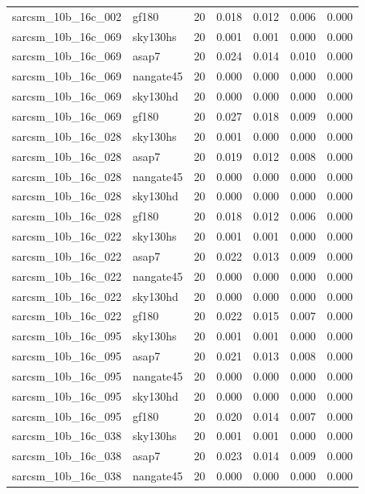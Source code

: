 \begin{tabular}{llrrrrr}
sarcsm\_10b\_16c\_002 & gf180 & 20 & 0.018 & 0.012 & 0.006 & 0.000 \\
sarcsm\_10b\_16c\_069 & sky130hs & 20 & 0.001 & 0.001 & 0.000 & 0.000 \\
sarcsm\_10b\_16c\_069 & asap7 & 20 & 0.024 & 0.014 & 0.010 & 0.000 \\
sarcsm\_10b\_16c\_069 & nangate45 & 20 & 0.000 & 0.000 & 0.000 & 0.000 \\
sarcsm\_10b\_16c\_069 & sky130hd & 20 & 0.000 & 0.000 & 0.000 & 0.000 \\
sarcsm\_10b\_16c\_069 & gf180 & 20 & 0.027 & 0.018 & 0.009 & 0.000 \\
sarcsm\_10b\_16c\_028 & sky130hs & 20 & 0.001 & 0.000 & 0.000 & 0.000 \\
sarcsm\_10b\_16c\_028 & asap7 & 20 & 0.019 & 0.012 & 0.008 & 0.000 \\
sarcsm\_10b\_16c\_028 & nangate45 & 20 & 0.000 & 0.000 & 0.000 & 0.000 \\
sarcsm\_10b\_16c\_028 & sky130hd & 20 & 0.000 & 0.000 & 0.000 & 0.000 \\
sarcsm\_10b\_16c\_028 & gf180 & 20 & 0.018 & 0.012 & 0.006 & 0.000 \\
sarcsm\_10b\_16c\_022 & sky130hs & 20 & 0.001 & 0.001 & 0.000 & 0.000 \\
sarcsm\_10b\_16c\_022 & asap7 & 20 & 0.022 & 0.013 & 0.009 & 0.000 \\
sarcsm\_10b\_16c\_022 & nangate45 & 20 & 0.000 & 0.000 & 0.000 & 0.000 \\
sarcsm\_10b\_16c\_022 & sky130hd & 20 & 0.000 & 0.000 & 0.000 & 0.000 \\
sarcsm\_10b\_16c\_022 & gf180 & 20 & 0.022 & 0.015 & 0.007 & 0.000 \\
sarcsm\_10b\_16c\_095 & sky130hs & 20 & 0.001 & 0.001 & 0.000 & 0.000 \\
sarcsm\_10b\_16c\_095 & asap7 & 20 & 0.021 & 0.013 & 0.008 & 0.000 \\
sarcsm\_10b\_16c\_095 & nangate45 & 20 & 0.000 & 0.000 & 0.000 & 0.000 \\
sarcsm\_10b\_16c\_095 & sky130hd & 20 & 0.000 & 0.000 & 0.000 & 0.000 \\
sarcsm\_10b\_16c\_095 & gf180 & 20 & 0.020 & 0.014 & 0.007 & 0.000 \\
sarcsm\_10b\_16c\_038 & sky130hs & 20 & 0.001 & 0.001 & 0.000 & 0.000 \\
sarcsm\_10b\_16c\_038 & asap7 & 20 & 0.023 & 0.014 & 0.009 & 0.000 \\
sarcsm\_10b\_16c\_038 & nangate45 & 20 & 0.000 & 0.000 & 0.000 & 0.000 \\

\end{tabular}
